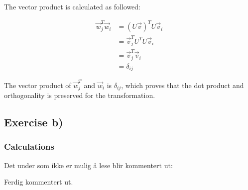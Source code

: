 \documentclass{article}
\begin{document}
\begin{multicols}{2}
The vector product is calculated as followed:

\begin{align*}
  \vec{w}_j ^T \vec{w}_i &= (U \vec{v})^T U \vec{v}_i \\
  &= \vec{v}_j ^T U^T U \vec{v}_i \\
  &= \vec{v}_j ^T \vec{v}_i \\
  &= \delta _{ij}
\end{align*}

The vector product of $\vec{w}_j ^T$ and $\vec{w}_i$ is $\delta_{ij}$, which proves that the dot product and orthogonality is preserved for the transformation.


\subsection{Exercise b)} \label{sec:Method b)}

  \subsubsection{Calculations}

    Det under som ikke er mulig å lese blir kommentert ut:

    \iffalse

    dovkdfv
    fvokdfv
    odkv
    dfvkd
    ofvkdfovkdf

    \fi

    Ferdig kommentert ut.


\end{multicols}
\end{document}
